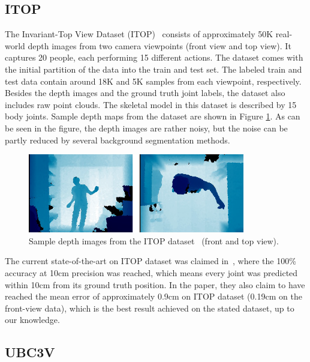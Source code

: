 \subsection{ITOP}
The Invariant-Top View Dataset (ITOP)~\cite{haque2016viewpoint} consists of approximately 50K real-world depth images from two camera viewpoints (front view and top view). It captures 20 people, each performing 15 different actions. The dataset comes with the initial partition of the data into the train and test set. The labeled train and test data contain around 18K and 5K samples from each viewpoint, respectively. Besides the depth images and the ground truth joint labels, the dataset also includes raw point clouds. The skeletal model in this dataset is described by 15 body joints. Sample depth maps from the dataset are shown in Figure \ref{fig:itop}. As can be seen in the figure, the depth images are rather noisy, but the noise can be partly reduced by several background segmentation methods.\par

\vspace{5mm}
\begin{figure}[H]
\begin{center}
  \includegraphics[height=130px]{images/implementation/itop.png}
  \caption[Sample depth images from the ITOP dataset.]{Sample depth images from the ITOP dataset~\cite{haque2016viewpoint} (front and top view).}
  \label{fig:itop}
\end{center}
\end{figure}

\noindent
The current state-of-the-art on ITOP dataset was claimed in~\cite{Marin18jvcir}, where the 100\% accuracy at 10cm precision was reached, which means every joint was predicted within 10cm from its ground truth position. In the paper, they also claim to have reached the mean error of approximately 0.9cm on ITOP dataset (0.19cm on the front-view data), which is the best result achieved on the stated dataset, up to our knowledge.

\subsection{UBC3V}


